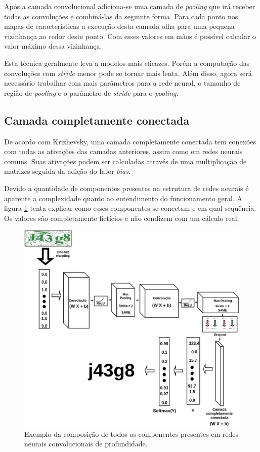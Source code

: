 Após a camada convolucional adiciona-se uma camada de
\textit{pooling} que irá receber todas as convoluções e combiná-las da
seguinte forma\cite{Dumoulin2016}. Para cada ponto nos mapas de
características a execução desta camada olha para uma pequena
vizinhança ao redor deste ponto. Com esses valores em mãos é possível
calcular o valor máximo dessa vizinhança.

Esta técnica geralmente leva a modelos mais eficazes. Porém a
computação das convoluções com \textit{stride} menor pode se tornar mais
lenta. Além disso, agora será necessário trabalhar com mais parâmetros
para a rede neural, o tamanho de região de \textit{pooling} e o
parâmetro de \textit{stride} para o \textit{pooling}.

\subsection{Camada completamente conectada}

De acordo com Krizhevsky\cite{Krizhevsky}, uma camada completamente
conectada tem conexões com todas as ativações das camadas anteriores,
assim como em redes neurais comuns. Suas ativações podem ser
calculadas através de uma multiplicação de matrizes seguida da adição
do fator \textit{bias}.

Devido a quantidade de componentes presentes na estrutura de redes
neurais é aparente a complexidade quanto ao entendimento do
funcionamento geral. A figura \ref{fig:neural_network} tenta explicar
como esses componentes se conectam e em qual sequência. Os valores são
completamente fictícios e não condizem com um cálculo real.

\begin{figure}[H]
\centering
\includegraphics[scale=0.5]{imagens/neural_network.eps}
\caption{Exemplo da composição de todos os componentes presentes em
  redes neurais convolucionais de profundidade.}
\label{fig:neural_network}
\end{figure}
